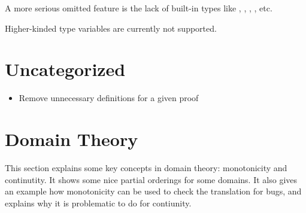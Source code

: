 A more serious omitted feature is the lack of built-in types like ,
, , , etc.

Higher-kinded type variables are currently not supported.

\section{Uncategorized}

\begin{itemize}

\item Remove unnecessary definitions for a given proof

\end{itemize}

\section{Domain Theory}

This section explains some key concepts in domain theory: monotonicity
and continutity. It shows some nice partial orderings for some
domains. It also gives an example how monotonicity can be used to
check the translation for bugs, and explains why it is problematic to
do for contiunity.
